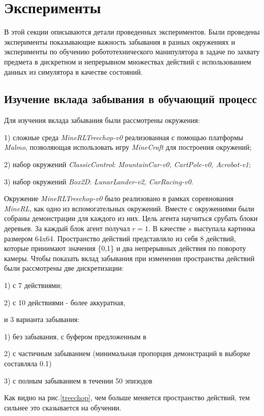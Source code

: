 \documentclass{mipt-thesis-bs}
\begin{document}
 
\chapter{Эксперименты}

В этой секции описываются детали проведенных экспериментов. Были проведены эксперименты показывающие важность забывания в разных окружениях и эксперименты по обучению робототехнического манипулятора в задаче по захвату предмета в дискретном и непрерывном множествах действий с использованием данных из симулятора в качестве состояний. 


\section{Изучение вклада забывания в обучающий процесс}

Для изучения вклада забывания были рассмотрены окружения:

1) сложные среда \textit{MineRLTreechop-v0} реализованная с помощью платформы \textit{Malmo}, позволяющая использовать игру \textit{MineCraft} для построения окружений;

2) набор окружений \textit{ClassicControl}: \textit{MountainCar-v0, CartPole-v0, Acrobot-v1};

3) набор окружений \textit{Box2D}: \textit{LunarLander-v2, CarRacing-v0}.

Окружение \textit{MineRLTreechop-v0} было реализовано в рамках соревнования \textit{MineRL}, как одно из вспомогательных окружений. Вместе с окружениями были собраны демонстрации для каждого из них. Цель агента научиться срубать блоки деревьев. За каждый блок агент получал $r=1$. В качестве $s$ выступала картинка размером 64x64. Пространство действий представляло из себя 8 действий, которые принимают значения \{0,1\} и два непрерывных действия по повороту камеры. Чтобы показать вклад забывания при изменении пространства действий были рассмотрены две дискретизации: 

1) с 7 действиями;

2) с 10 действиями - более аккуратная,

и 3 варианта забывания:

1) без забывания, с буфером предложенным в \cite{dqfd}

2) с частичным забыванием (минимальная пропорция демонстраций в выборке составляла 0.1)

3) с полным забыванием в течении 50 эпизодов

Как видно на рис.\ref{treechop}, чем больше меняется пространство действий, тем сильнее это сказывается на обучении. 
\end{document}
